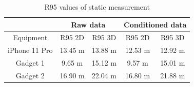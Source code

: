 \documentclass{article}
\begin{document}
			\begin{table}[h]
				\centering
				\begin{tabular}{|c|c|c|c|c|}
					\hline 
					& \multicolumn{2}{c|}{Raw data} & \multicolumn{2}{c|}{Conditioned data} \\ 
					\hline 
					Equipment & R95 2D & R95 3D & R95 2D & R95 3D \\ 
					\hline 
					iPhone 11 Pro & 13.45 m & 13.88 m & 12.53 m & 12.92 m \\ 
					\hline 
					Gadget 1 & 9.65 m & 15.12 m & 9.57 m & 15.01 m \\ 
					\hline 
					Gadget 2 & 16.90 m & 22.04 m & 16.80 m & 21.88 m \\ 
					\hline 
				\end{tabular} 
			\caption{R95 values of static measurement}
			\label{table:static_results}
			\end{table}
			
\end{document}
